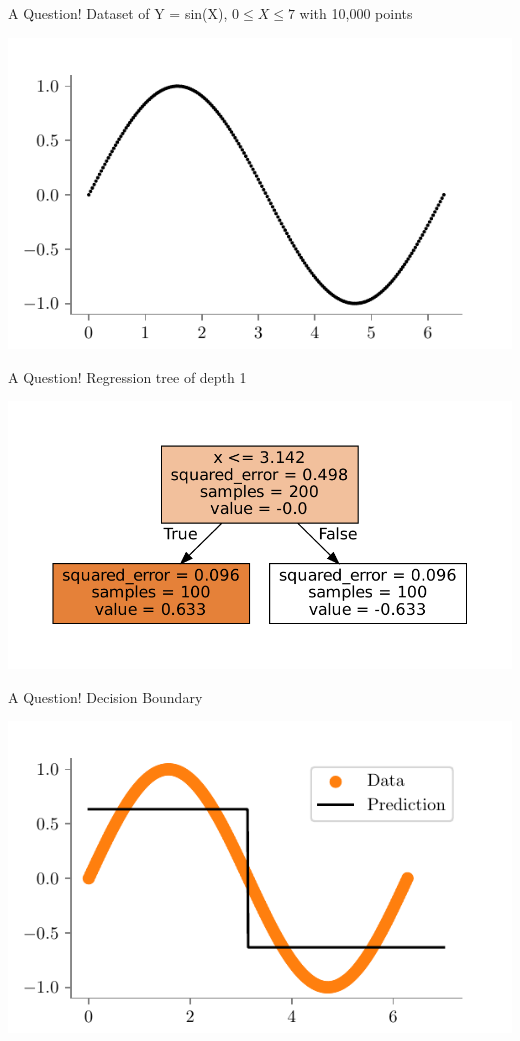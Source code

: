 \documentclass{beamer}
\begin{document}
\begin{frame}{A Question!}
Dataset of Y = sin(X), $0 \leq X \leq 7$ with 10,000 points 
\begin{center}
\includegraphics{../figures/decision-trees/sine-dataset.pdf}
\end{center}
\end{frame}

\begin{frame}{A Question!}
Regression tree of depth 1
\begin{center}
\includegraphics[scale=0.6]{../figures/decision-trees/sine-depth-1-sklearn.pdf}
\end{center}
\end{frame}

\begin{frame}{A Question!}
Decision Boundary
\begin{center}
\includegraphics{../figures/decision-trees/sine-depth-1.pdf}
\end{center}
\end{frame}
\end{document}
